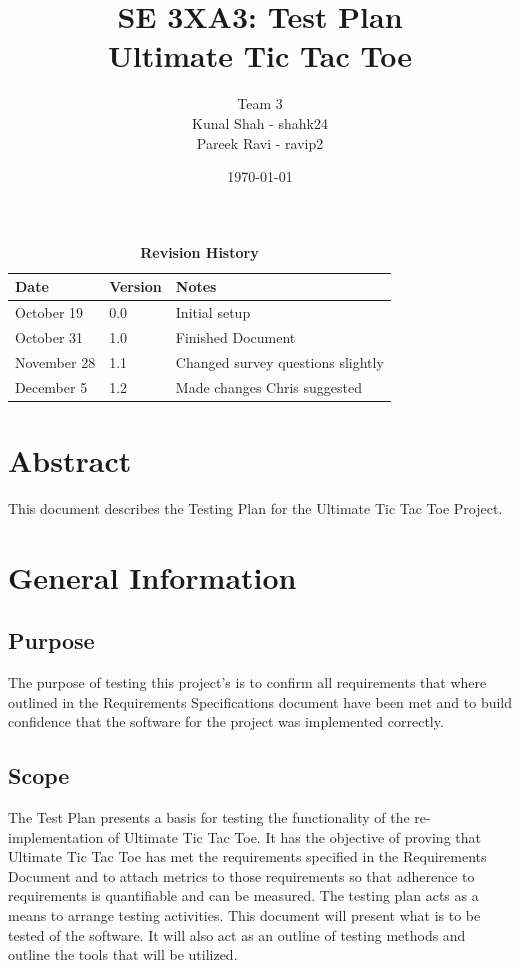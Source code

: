\documentclass[12pt, titlepage]{article}
\title{SE 3XA3: Test Plan\\Ultimate Tic Tac Toe}
\author{Team 3
		\\ Kunal Shah - shahk24
		\\ Pareek Ravi - ravip2
}
\date{\today}
\begin{document}
\maketitle

\tableofcontents
\listoftables
\listoffigures

\newpage
\begin{table}[hp]
\caption{\bf Revision History}
\begin{tabularx}{\textwidth}{p{3cm}p{2cm}X}
\toprule {\bf Date} & {\bf Version} & {\bf Notes}\\
\midrule
October 19 & 0.0 & Initial setup\\
October 31 & 1.0 & Finished Document \\
November 28 & 1.1 & Changed survey questions slightly\\
December 5 & 1.2 & Made changes Chris suggested\\
\bottomrule
\end{tabularx}
\end{table}

\newpage


\section*{Abstract} 
This document describes the Testing Plan for the Ultimate Tic Tac Toe Project.

\section{General Information}

\subsection{Purpose}
The purpose of testing this project's is to confirm all requirements that where
outlined in the Requirements Specifications document have been met and to build
confidence that the software for the project was implemented correctly.

\subsection{Scope}
The Test Plan presents a basis for testing the functionality of the re-
implementation of Ultimate Tic Tac Toe. It has the objective of proving that
Ultimate Tic Tac Toe has met the requirements specified in the Requirements
Document and to attach metrics to those requirements so that adherence to
requirements is quantifiable and can be measured. The testing plan acts as a
means to arrange testing activities. This document will present what is to be
tested of the software. It will also act as an outline of testing methods and
outline the tools that will be utilized.
\end{document}
